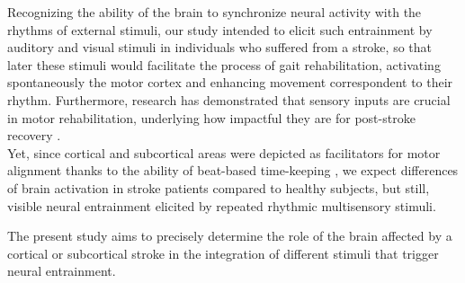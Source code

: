 Recognizing the ability of the brain to synchronize neural activity with the rhythms of external stimuli, our study intended to elicit such entrainment by auditory and visual stimuli in individuals who suffered from a stroke, so that later these stimuli would facilitate the process of gait rehabilitation, activating spontaneously the motor cortex and enhancing movement correspondent to their rhythm. Furthermore, research has demonstrated that sensory inputs are crucial in motor rehabilitation, underlying how impactful they are for post-stroke recovery \parencite{Chen_2018}.\\
Yet, since cortical and subcortical areas were depicted as facilitators for motor alignment thanks to the ability of beat-based time-keeping \parencite{Cannon_2021}, we expect differences of brain activation in stroke patients compared to healthy subjects, but still, visible neural entrainment elicited by repeated rhythmic multisensory stimuli. 

The present study aims to precisely determine the role of the brain affected by a cortical or subcortical stroke in the integration of different stimuli that trigger neural entrainment. 



